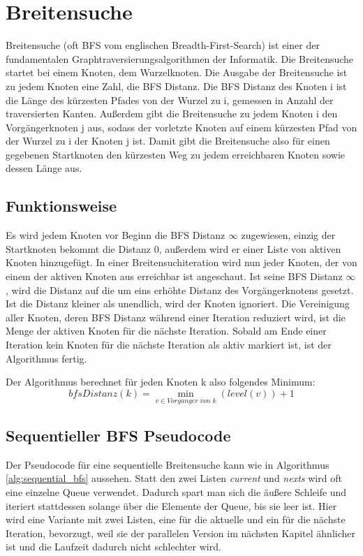 
\section{Breitensuche} %
\label{sec:breitensuche}

Breitensuche (oft BFS vom englischen Breadth-First-Search) ist einer der fundamentalen Graphtraversierungsalgorithmen der Informatik. Die Breitensuche startet bei einem Knoten, dem Wurzelknoten. Die Ausgabe der Breitensuche ist zu jedem Knoten eine Zahl, die BFS Distanz. Die BFS Distanz des Knoten i ist die Länge des kürzesten Pfades von der Wurzel zu i, gemessen in Anzahl der traversierten Kanten. Außerdem gibt die Breitensuche zu jedem Knoten i den Vorgängerknoten j aus, sodass der vorletzte Knoten auf einem kürzesten Pfad von der Wurzel zu i der Knoten j ist. Damit gibt die Breitensuche also für einen gegebenen Startknoten den kürzesten Weg zu jedem erreichbaren Knoten sowie dessen Länge aus.

\subsection{Funktionsweise} %
\label{sub:funktionsweise}
Es wird jedem Knoten vor Beginn die BFS Distanz $ \infty $ zugewiesen, einzig der Startknoten bekommt die Distanz 0, außerdem wird er einer Liste von aktiven Knoten hinzugefügt. In einer Breitensuchiteration wird nun jeder Knoten, der von einem der aktiven Knoten aus erreichbar ist angeschaut. Ist seine BFS Distanz $ \infty $, wird die Distanz auf die um eins erhöhte Distanz des Vorgängerknotens gesetzt. Ist die Distanz kleiner als unendlich, wird der Knoten ignoriert. Die Vereinigung aller Knoten, deren BFS Distanz während einer Iteration reduziert wird, ist die Menge der aktiven Knoten für die nächste Iteration. Sobald am Ende einer Iteration kein Knoten für die nächste Iteration als aktiv markiert ist, ist der Algorithmus fertig. 

Der Algorithmus berechnet für jeden Knoten k also folgendes Minimum\cite{Hassaan:2010:OUA:1854273.1854341}:
$$
bfsDistanz(k) =  \min_{v \in Vorg\ddot{a}nger \; von \; k} (level(v))+1
$$


\subsection{Sequentieller BFS Pseudocode} %
\label{sub:sequentieller_bfs_pseudocode}
Der Pseudocode für eine sequentielle Breitensuche kann wie in Algorithmus \ref{alg:sequential_bfs} aussehen. Statt den zwei Listen \textit{current} und \textit{nexts} wird oft eine einzelne Queue verwendet. Dadurch spart man sich die äußere Schleife und iteriert stattdessen solange über die Elemente der Queue, bis sie leer ist. Hier wird eine Variante mit zwei Listen, eine für die aktuelle und ein für die nächste Iteration, bevorzugt, weil sie der parallelen Version im nächsten Kapitel ähnlicher ist und die Laufzeit dadurch nicht schlechter wird.

